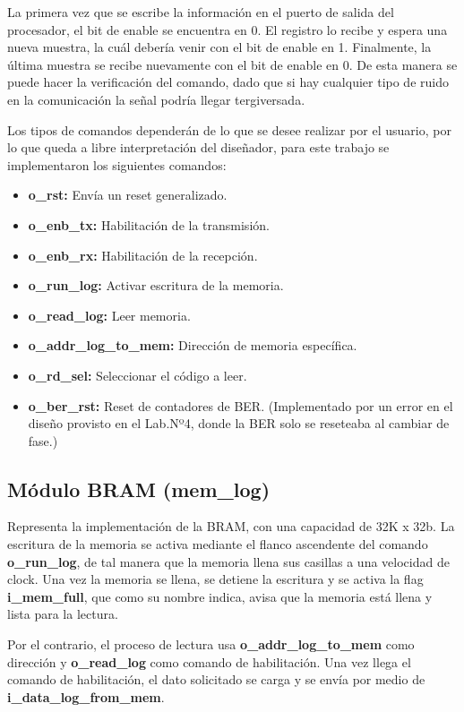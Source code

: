 \documentclass[12pt, a4paper]{article}
\begin{document}
        La primera vez que se escribe la información en el puerto de salida del procesador, el bit de enable se encuentra en 0. El registro lo recibe y espera una nueva muestra, la cuál debería venir con el
        bit de enable en 1. Finalmente, la última muestra se recibe nuevamente con el bit de enable en 0. 
        De esta manera se puede hacer la verificación del comando, dado que si hay cualquier tipo de ruido en la comunicación la señal podría llegar tergiversada.

        Los tipos de comandos dependerán de lo que se desee realizar por el usuario, por lo que queda a libre interpretación del diseñador, para este trabajo se implementaron
        los siguientes comandos:
        \begin{itemize}
            \item \textbf{o\_rst:} Envía un reset generalizado.
            \item \textbf{o\_enb\_tx:} Habilitación de la transmisión.
            \item \textbf{o\_enb\_rx:} Habilitación de la recepción.
            \item \textbf{o\_run\_log:} Activar escritura de la memoria.
            \item \textbf{o\_read\_log:} Leer memoria.
            \item \textbf{o\_addr\_log\_to\_mem:} Dirección de memoria específica.
            \item \textbf{o\_rd\_sel:} Seleccionar el código a leer.
            \item \textbf{o\_ber\_rst:} Reset de contadores de BER. (Implementado por un error en el diseño provisto en el Lab.Nº4, donde la BER solo se reseteaba al cambiar de fase.)
        \end{itemize}
    \subsection{Módulo BRAM (mem\_log)}    
        Representa la implementación de la BRAM, con una capacidad de 32K x 32b. La escritura de la memoria se activa mediante el flanco ascendente del comando
        \textbf{o\_run\_log}, de tal manera que la memoria llena sus casillas a una velocidad de clock. Una vez la memoria se llena, se detiene la escritura y se activa la flag
        \textbf{i\_mem\_full}, que como su nombre indica, avisa que la memoria está llena y lista para la lectura.

        Por el contrario, el proceso de lectura usa \textbf{o\_addr\_log\_to\_mem} como dirección y \textbf{o\_read\_log} como comando de habilitación. Una vez llega el comando
        de habilitación, el dato solicitado se carga y se envía por medio de \textbf{i\_data\_log\_from\_mem}.
\end{document}
